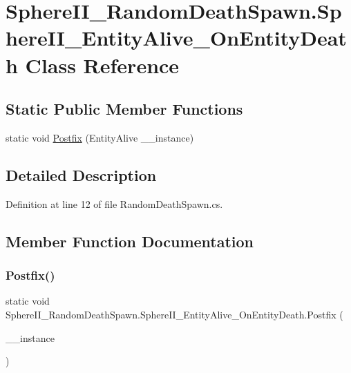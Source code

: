 \hypertarget{class_sphere_i_i___random_death_spawn_1_1_sphere_i_i___entity_alive___on_entity_death}{}\section{Sphere\+I\+I\+\_\+\+Random\+Death\+Spawn.\+Sphere\+I\+I\+\_\+\+Entity\+Alive\+\_\+\+On\+Entity\+Death Class Reference}
\label{class_sphere_i_i___random_death_spawn_1_1_sphere_i_i___entity_alive___on_entity_death}
\subsection*{Static Public Member Functions}
\begin{DoxyCompactItemize}
\item 
static void \mbox{\hyperlink{class_sphere_i_i___random_death_spawn_1_1_sphere_i_i___entity_alive___on_entity_death_a8b10c5370c49244f2c51a96b7f35b20d}{Postfix}} (Entity\+Alive \+\_\+\+\_\+instance)
\end{DoxyCompactItemize}


\subsection{Detailed Description}


Definition at line 12 of file Random\+Death\+Spawn.\+cs.



\subsection{Member Function Documentation}
\mbox{\label{class_sphere_i_i___random_death_spawn_1_1_sphere_i_i___entity_alive___on_entity_death_a8b10c5370c49244f2c51a96b7f35b20d}} 
\subsubsection{\texorpdfstring{Postfix()}{Postfix()}}
{\footnotesize\ttfamily static void Sphere\+I\+I\+\_\+\+Random\+Death\+Spawn.\+Sphere\+I\+I\+\_\+\+Entity\+Alive\+\_\+\+On\+Entity\+Death.\+Postfix (\begin{DoxyParamCaption}\item[{Entity\+Alive}]{\+\_\+\+\_\+instance }\end{DoxyParamCaption})\hspace{0.3cm}{\ttfamily [static]}}



